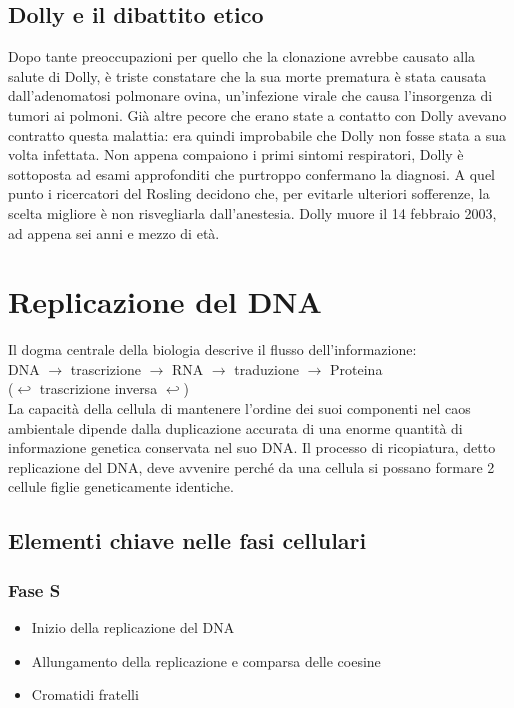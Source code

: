 \documentclass{article}
\begin{document}
\subsection{Dolly e il dibattito etico}Dopo tante preoccupazioni per quello che la clonazione avrebbe causato alla salute di Dolly, è triste constatare che la sua morte prematura è stata causata dall'adenomatosi polmonare ovina, un'infezione virale che causa l'insorgenza di tumori ai polmoni. Già altre pecore che erano state a contatto con Dolly avevano contratto questa malattia: era quindi improbabile che Dolly non fosse stata a sua volta infettata. Non appena compaiono i primi sintomi respiratori, Dolly è sottoposta ad esami approfonditi che purtroppo confermano la diagnosi. A quel punto i ricercatori del Rosling decidono che, per evitarle ulteriori sofferenze, la scelta migliore è non risvegliarla dall'anestesia. Dolly muore il 14 febbraio 2003, ad appena sei anni e mezzo di età.

\section{Replicazione del DNA}Il dogma centrale della biologia descrive il flusso dell'informazione: \\

DNA $\rightarrow$ trascrizione $\rightarrow$ RNA $\rightarrow$ traduzione $\rightarrow$ Proteina \\
\tab ($\hookleftarrow$ trascrizione inversa $\hookleftarrow$)\\

\noindent La capacità della cellula di mantenere l'ordine dei suoi componenti nel caos ambientale dipende dalla duplicazione accurata di una enorme quantità di informazione genetica conservata nel suo DNA. Il processo di ricopiatura, detto replicazione del DNA, deve avvenire perché da una cellula si possano formare 2 cellule figlie geneticamente identiche. 
\subsection{Elementi chiave nelle fasi cellulari}
\subsubsection{Fase S}

\begin{itemize}
    \item Inizio della replicazione del DNA 
    \item Allungamento della replicazione e comparsa delle coesine
    \item Cromatidi fratelli 
\end{itemize}
\end{document}
